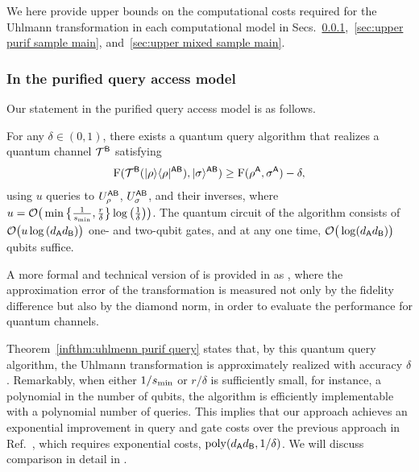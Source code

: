 We here provide upper bounds on the computational costs required for the Uhlmann transformation in each computational model in Secs.~\ref{sec:upper purif query main},~\ref{sec:upper purif sample main}, and~\ref{sec:upper mixed sample main}.





\subsubsection{In the purified query access model}
\label{sec:upper purif query main}


Our statement in the purified query access model is as follows.


\begin{theorem}
\label{infthm:uhlmenn purif query}
For any $\delta \in (0, 1)$, there exists a quantum query algorithm that realizes a quantum channel ${\mathcal{T}}^{{\mathsf{B}}}$ satisfying 
\begin{align}
\label{inteq:17}
     {\mathrm{F}}({\mathcal{T}}^{{\mathsf{B}}}(|\rho\rangle\langle\rho|^{{\mathsf{A}}{\mathsf{B}}}), |\sigma\rangle^{{\mathsf{A}}{\mathsf{B}}}) \geq {\mathrm{F}}(\rho^{\mathsf{A}}, \sigma^{\mathsf{A}}) - \delta,
\end{align}
using $u$ queries to $U_\rho^{{\mathsf{A}}{\mathsf{B}}}$, $U_\sigma^{{\mathsf{A}}{\mathsf{B}}}$, and their inverses, where $u = {\mathcal{O}}\big(\min\big\{\frac{1}{s_{\rm min}}, \frac{r}{\delta}\big\}\log{\big(\frac{1}{\delta}\big)}\big)$. The quantum circuit of the algorithm consists of ${\mathcal{O}}\big(u\log{(d_{\mathsf{A}}d_{\mathsf{B}})}\big)$ one- and two-qubit gates, and at any one time, ${\mathcal{O}}\big(\log(d_{\mathsf{A}} d_{\mathsf{B}})\big)$ qubits suffice.
\end{theorem}


A more formal and technical version of  is provided in  as , where the approximation error of the transformation is measured not only by the fidelity difference but also by the diamond norm, in order to evaluate the performance for quantum channels.



Theorem~\ref{infthm:uhlmenn purif query} states that, by this quantum query algorithm, the Uhlmann transformation is approximately realized with accuracy $\delta$.
Remarkably, when either $1/s_{\rm min}$ or $r/\delta$ is sufficiently small, for instance, a polynomial in the number of qubits, the algorithm is efficiently implementable with a polynomial number of queries.
This implies that our approach achieves an exponential improvement in query and gate costs over the previous approach in Ref.~\cite{metger2023stateqipspace}, which requires exponential costs, $\mathrm{poly}(d_{\mathsf{A}} d_{\mathsf{B}}, 1/\delta)$.
We will discuss comparison in detail in .




